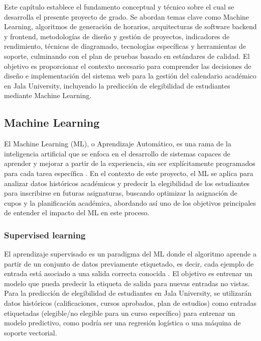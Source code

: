Este capítulo establece el fundamento conceptual y técnico sobre el cual se desarrolla el presente proyecto de grado.
Se abordan temas clave como Machine Learning, algoritmos de generación de horarios, arquitecturas de software backend y frontend, metodologías de diseño y gestión de proyectos, indicadores de rendimiento, técnicas de diagramado, tecnologías específicas y herramientas de soporte, culminando con el plan de pruebas basado en estándares de calidad. El objetivo es proporcionar el contexto necesario para comprender las decisiones de diseño e implementación del sistema web para la gestión del calendario académico en Jala University, incluyendo la predicción de elegibilidad de estudiantes mediante Machine Learning.

\subsection{Machine Learning}
El Machine Learning (ML), o Aprendizaje Automático, es una rama de la inteligencia artificial que se enfoca en el desarrollo de sistemas capaces de aprender y mejorar a partir de la experiencia, sin ser explícitamente programados para cada tarea específica \parencite{Samuel1959}.
En el contexto de este proyecto, el ML se aplica para analizar datos históricos académicos y predecir la elegibilidad de los estudiantes para inscribirse en futuras asignaturas, buscando optimizar la asignación de cupos y la planificación académica, abordando así uno de los objetivos principales de entender el impacto del ML en este proceso.

\subsubsection{Supervised learning}
El aprendizaje supervisado es un paradigma del ML donde el algoritmo aprende a partir de un conjunto de datos previamente etiquetado, es decir, cada ejemplo de entrada está asociado a una salida correcta conocida \parencite{Bishop2006}.
El objetivo es entrenar un modelo que pueda predecir la etiqueta de salida para nuevas entradas no vistas. Para la predicción de elegibilidad de estudiantes en Jala University, se utilizarán datos históricos (calificaciones, cursos aprobados, plan de estudios) como entradas etiquetadas (elegible/no elegible para un curso específico) para entrenar un modelo predictivo, como podría ser una regresión logística o una máquina de soporte vectorial.

